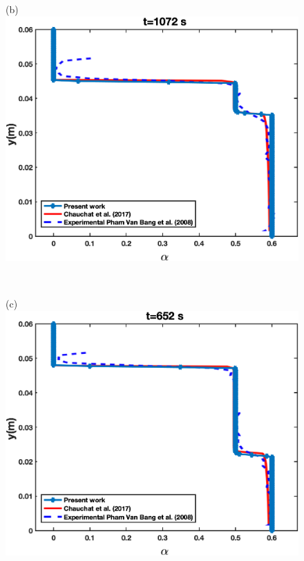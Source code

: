 \documentclass[review,3p,times,12pt]{elsarticle}
\begin{document}
\begin{minipage}[t]{0.5\textwidth}
\begin{figure}[H]
\begin{center}
(b)\includegraphics[scale = 0.45]{figs/E3}
\end{center}
\end{figure}
\end{minipage}\\
\begin{minipage}[t]{0.5\textwidth}
\begin{figure}[H]
\begin{center}
(c)\includegraphics[scale = 0.45]{figs/E2}
\end{center}
\end{figure}
\end{minipage} \hfill 
\end{document}

